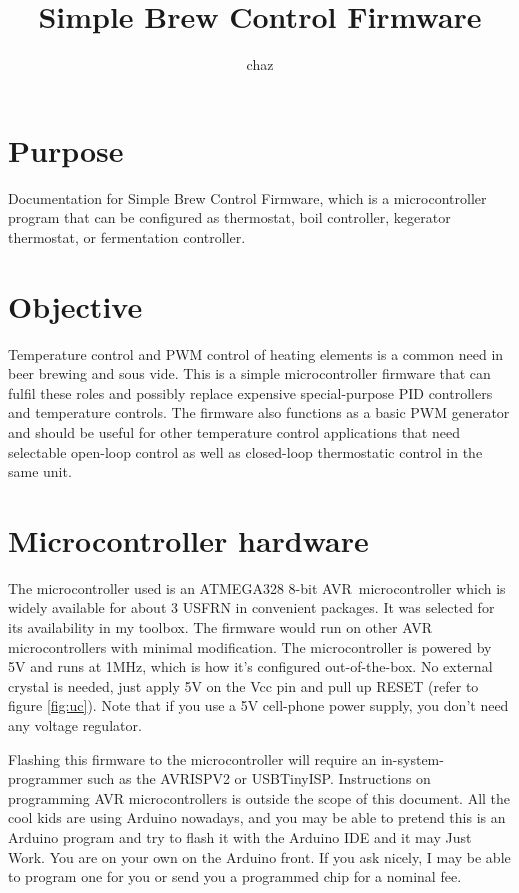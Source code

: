 \documentclass[dvips,12pt]{article}
\title{Simple Brew Control Firmware}
\author{chaz}
\begin{document}
\frenchspacing


\section{Purpose}
Documentation for Simple Brew Control Firmware, which is a microcontroller program that can be configured as thermostat, boil
controller, kegerator thermostat, or fermentation controller. 

\tableofcontents
\listoffigures

\section{Objective}

Temperature control and PWM control of heating elements is a common need in beer brewing and sous vide. This is a simple
microcontroller firmware that can fulfil these roles and possibly replace expensive special-purpose PID controllers and temperature controls. The firmware also functions as a basic PWM generator and should be useful for other temperature control applications that need selectable open-loop control as well as closed-loop thermostatic control in the same unit. 

\section{Microcontroller hardware}

The microcontroller used is an ATMEGA328 8-bit AVR\textcopyright\ microcontroller which is widely available for about 3
USFRN in convenient packages. It was selected for its availability in my toolbox. The firmware would run on other AVR
microcontrollers with minimal modification. The microcontroller is powered by 5V and runs at 1MHz, which is how it's
configured out-of-the-box.  No external crystal is needed, just apply 5V on the Vcc pin and
pull up RESET (refer to
figure \ref{fig:uc}). Note that if you use a 5V cell-phone power supply, you don't need
any voltage regulator.

Flashing this firmware to the microcontroller will require an in-system-programmer such as the AVRISPV2 or USBTinyISP.
Instructions on programming AVR microcontrollers is outside the scope of this document. All the cool kids are using
Arduino nowadays, and you may be able to pretend this is an Arduino program and try to flash it with the Arduino IDE and
it may Just Work. You are on your own on the Arduino front. If you ask nicely, I may be able to program one for you or
send you a programmed chip for a nominal fee.
\end{document}
